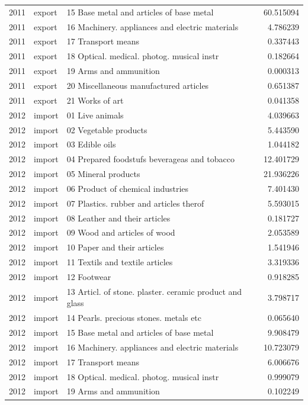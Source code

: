 \begin{tabular}{rllr}
2011 & export & 15 Base metal and articles of base metal & 60.515094 \\
2011 & export & 16 Machinery. appliances and electric materials & 4.786239 \\
2011 & export & 17 Transport means & 0.337443 \\
2011 & export & 18 Optical. medical. photog. musical instr & 0.182664 \\
2011 & export & 19 Arms and ammunition & 0.000313 \\
2011 & export & 20 Miscellaneous manufactured articles & 0.651387 \\
2011 & export & 21 Works of art & 0.041358 \\
2012 & import & 01 Live animals & 4.039663 \\
2012 & import & 02 Vegetable products & 5.443590 \\
2012 & import & 03 Edible oils & 1.044182 \\
2012 & import & 04 Prepared foodstufs beverageas and tobacco & 12.401729 \\
2012 & import & 05 Mineral products & 21.936226 \\
2012 & import & 06 Product of chemical industries & 7.401430 \\
2012 & import & 07 Plastics. rubber and articles therof & 5.593015 \\
2012 & import & 08 Leather and their articles & 0.181727 \\
2012 & import & 09 Wood and articles of wood & 2.053589 \\
2012 & import & 10 Paper and their articles & 1.541946 \\
2012 & import & 11 Textils and textile articles & 3.319336 \\
2012 & import & 12 Footwear & 0.918285 \\
2012 & import & 13 Articl. of stone. plaster. ceramic product and glass & 3.798717 \\
2012 & import & 14 Pearls. precious stones. metals etc & 0.065640 \\
2012 & import & 15 Base metal and articles of base metal & 9.908479 \\
2012 & import & 16 Machinery. appliances and electric materials & 10.723079 \\
2012 & import & 17 Transport means & 6.006676 \\
2012 & import & 18 Optical. medical. photog. musical instr & 0.999079 \\
2012 & import & 19 Arms and ammunition & 0.102249 \\

\end{tabular}
